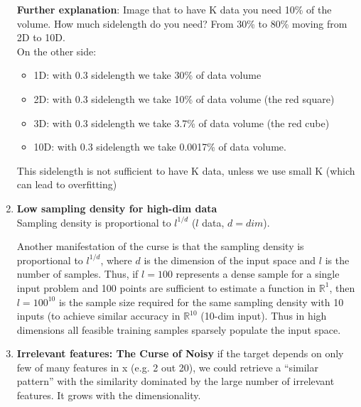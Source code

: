 \documentclass[../main.tex]{subfiles}
\begin{document}
\begin{enumerate}
    \textbf{Further explanation}:
    Image that to have K data you need 10\% of the volume. How much sidelength do you need? From 30\% to 80\% moving from 2D to 10D.\\
    
    On the other side:
    \begin{itemize}
        \item 1D: with 0.3 sidelength we take 30\% of data volume
        \item 2D: with 0.3 sidelength we take 10\% of data volume (the red square)
        \item 3D: with 0.3 sidelength we take 3.7\% of data volume (the red cube)
        \item 10D: with 0.3 sidelength we take 0.0017\% of data volume.
    \end{itemize}
    This sidelength is not sufficient to have K data, unless we use small K (which can lead to overfitting)
    
    \item \textbf{Low sampling density for high-dim data}\\
    Sampling density is proportional to $l^{1/d}$ ($l$ data, $d=dim$).
    
    Another manifestation of the curse is that the sampling density is proportional to  $l^{1/d}$, where $d$ is the dimension of the input space and $l$ is the number of samples. Thus, if $l = 100$ represents a dense sample for a single input problem and 100 points are sufficient to estimate a function in $\mathbb{R}^1$, then $l = 100^{10}$ is the sample size required for the same sampling density with 10 inputs (to achieve similar accuracy in $\mathbb{R}^{10}$ (10-dim input). Thus in high dimensions all feasible training samples sparsely populate the input space.
    
    \item \textbf{Irrelevant features: The Curse of Noisy}
    if the target depends on only few of many features in x (e.g. 2 out 20), we could retrieve a “similar pattern” with the similarity dominated by the large number of irrelevant features. It grows with the dimensionality.
    

\end{enumerate}
\end{document}
